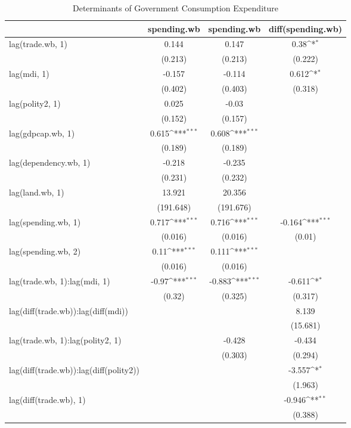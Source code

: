 \def\sym#1{\ifmmode^{#1}\else\(^{#1}\)\fi}
\begin{table}[htbp]
\caption {Determinants of Government Consumption Expenditure} \label{tab:title} 
\footnotesize
\begin{tabular}{l*{3}{c}}
\hline\hline
  &\multicolumn{1}{c}{spending.wb} &\multicolumn{1}{c}{spending.wb} &\multicolumn{1}{c}{diff(spending.wb)} \\
\hline
lag(trade.wb, 1) 		&0.144 		&0.147 		&0.38\sym{*}\\
  		&(0.213) 		&(0.213) 		&(0.222) \\
lag(mdi, 1) 		&-0.157 		&-0.114 		&0.612\sym{*} \\
  		&(0.402) 		&(0.403) 		&(0.318) \\
lag(polity2, 1) 		&0.025 		&-0.03 		& \\
  		&(0.152) 		&(0.157) 		& \\
lag(gdpcap.wb, 1) 		&0.615\sym{***} 		&0.608\sym{***} 		& \\
  		&(0.189) 		&(0.189) 		& \\
lag(dependency.wb, 1) 		&-0.218 		&-0.235 		& \\
  		&(0.231) 		&(0.232) 		& \\
lag(land.wb, 1) 		&13.921 		&20.356 		& \\
  		&(191.648) 		&(191.676) 		& \\
lag(spending.wb, 1) 		&0.717\sym{***} 		&0.716\sym{***} 		&-0.164\sym{***} \\
  		&(0.016) 		&(0.016) 		&(0.01) \\
lag(spending.wb, 2) 		&0.11\sym{***} 		&0.111\sym{***} 		& \\
  		&(0.016) 		&(0.016) 		& \\
lag(trade.wb, 1):lag(mdi, 1) 		&-0.97\sym{***} 		&-0.883\sym{***} 		&-0.611\sym{*} \\
  		&(0.32) 		&(0.325) 		&(0.317) \\
lag(diff(trade.wb)):lag(diff(mdi)) 		& 		& 		&8.139 \\
  		& 		& 		&(15.681) \\
lag(trade.wb, 1):lag(polity2, 1) 		& 		&-0.428 		&-0.434 \\
  		& 		&(0.303) 		&(0.294) \\
lag(diff(trade.wb)):lag(diff(polity2)) 		& 		& 		&-3.557\sym{*} \\
  		& 		& 		&(1.963) \\
lag(diff(trade.wb), 1) 		& 		& 		&-0.946\sym{**} \\
  		& 		& 		&(0.388) \\

\end{tabular}
\end{table}
